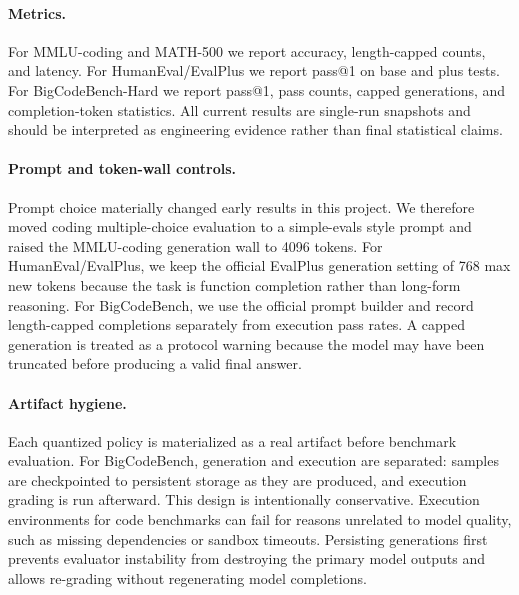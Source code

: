 \documentclass{article}
\begin{document}
\paragraph{Metrics.}
For MMLU-coding and MATH-500 we report accuracy, length-capped counts, and latency. For HumanEval/EvalPlus we report pass@1 on base and plus tests. For BigCodeBench-Hard we report pass@1, pass counts, capped generations, and completion-token statistics. All current results are single-run snapshots and should be interpreted as engineering evidence rather than final statistical claims.

\paragraph{Prompt and token-wall controls.}
Prompt choice materially changed early results in this project. We therefore moved coding multiple-choice evaluation to a simple-evals style prompt and raised the MMLU-coding generation wall to 4096 tokens. For HumanEval/EvalPlus, we keep the official EvalPlus generation setting of 768 max new tokens because the task is function completion rather than long-form reasoning. For BigCodeBench, we use the official prompt builder and record length-capped completions separately from execution pass rates. A capped generation is treated as a protocol warning because the model may have been truncated before producing a valid final answer.

\paragraph{Artifact hygiene.}
Each quantized policy is materialized as a real artifact before benchmark evaluation. For BigCodeBench, generation and execution are separated: samples are checkpointed to persistent storage as they are produced, and execution grading is run afterward. This design is intentionally conservative. Execution environments for code benchmarks can fail for reasons unrelated to model quality, such as missing dependencies or sandbox timeouts. Persisting generations first prevents evaluator instability from destroying the primary model outputs and allows re-grading without regenerating model completions.
\end{document}
